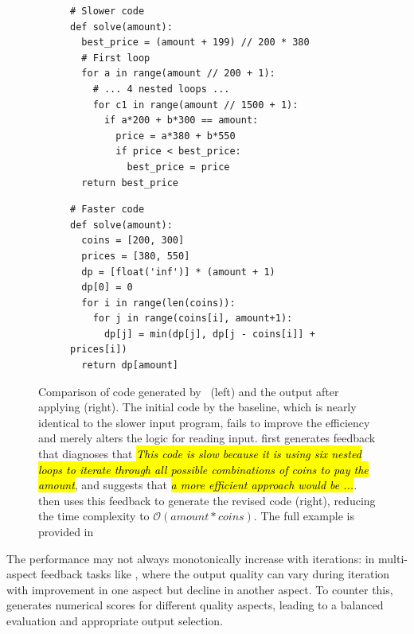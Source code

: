 \begin{figure}[t!]
\begin{subfigure}[t]{.5\textwidth}
\centering
\begin{minipage}[c][8cm]{\linewidth}
\begin{verbatim}
# Slower code
def solve(amount):
  best_price = (amount + 199) // 200 * 380
  # First loop
  for a in range(amount // 200 + 1):
    # ... 4 nested loops ...
    for c1 in range(amount // 1500 + 1):
      if a*200 + b*300 == amount:
        price = a*380 + b*550
        if price < best_price:
          best_price = price
  return best_price
\end{verbatim}
\end{minipage}
\end{subfigure}%
\begin{subfigure}[t]{.5\textwidth}
\centering
\begin{minipage}[c][8cm]{\linewidth}
\begin{verbatim}
# Faster code
def solve(amount):
  coins = [200, 300]
  prices = [380, 550]
  dp = [float('inf')] * (amount + 1)
  dp[0] = 0
  for i in range(len(coins)):
    for j in range(coins[i], amount+1):
      dp[j] = min(dp[j], dp[j - coins[i]] + prices[i])
  return dp[amount]
\end{verbatim}

\end{minipage}
\end{subfigure}
\caption{Comparison of code generated by~\citet{pie} (left) and the output after applying \ours (right). The initial code by the baseline, which is nearly identical to the slower input program, fails to improve the efficiency and merely alters the logic for reading input. \ours first generates feedback that diagnoses 
that \hl{\textit{This code is slow because it is using six nested loops to iterate through all possible combinations of coins to pay the amount}}, and suggests that \hl{\textit{a more efficient approach would be ...}}.
\ours then uses this feedback to generate the revised code (right), reducing the time complexity to $\mathcal{O}(amount*coins)$. 
The full example is provided in 
}
\label{fig:analysis_example}
\end{figure}

The performance may not always monotonically increase with iterations: in multi-aspect feedback tasks like \acrogen, where the output quality can vary during iteration with improvement in one aspect but decline in another aspect. To counter this, \ours generates numerical scores for different quality aspects, leading to a balanced evaluation and appropriate output selection. 


